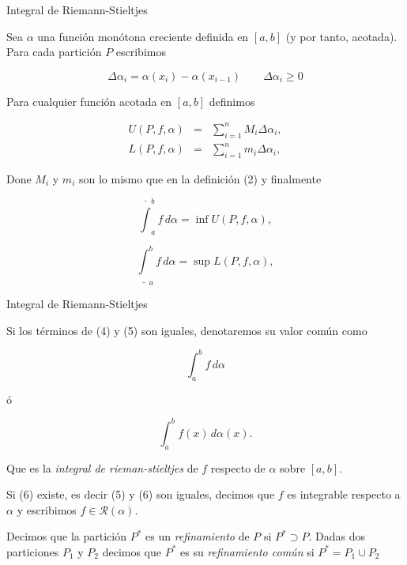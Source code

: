 \documentclass[11pt]{beamer}
\begin{document}
\begin{frame}{Integral de Riemann-Stieltjes}

Sea $\alpha$ una función monótona creciente definida en $[a, b]$ (y por tanto, acotada). Para cada partición $P$ escribimos

\[
	\Delta \alpha_i = \alpha(x_i) - \alpha(x_{i-1}) \qquad \Delta\alpha_i \geq 0
\]

Para cualquier función acotada en $[a, b]$ definimos

\[
	\begin{array}{rcl}
		U(P, f, \alpha) & = & \sum_{i=1}^n M_i \Delta \alpha_i, \\
		L(P, f, \alpha) & = & \sum_{i=1}^n m_i \Delta \alpha_i,
	\end{array}
\]

Done $M_i$ y $m_i$ son lo mismo que en la definición (2) y finalmente 

\begin{equation}
	\overline{\int}_a^b f\,d\alpha = \inf U(P, f, \alpha),
\end{equation}

\begin{equation}
	\underline{\int}_a^b f\,d\alpha = \sup L(P, f, \alpha),
\end{equation}

\end{frame}

\begin{frame}{Integral de Riemann-Stieltjes}

\begin{definition}[4]

Si los términos de (4) y (5) son iguales, denotaremos su valor común como

\begin{equation}
	\int_a^b f\,d\alpha
\end{equation}

ó

\begin{equation}
	\int_a^b f(x)\,d\alpha(x).
\end{equation}

Que es la \textit{integral de rieman-stieltjes} de $f$ respecto de $\alpha$ sobre $[a, b]$.

Si (6) existe, es decir (5) y (6) son iguales, decimos que $f$ es integrable respecto a $\alpha$ y escribimos $f \in \mathcal{R}(\alpha)$.

\end{definition}

\end{frame}

\begin{frame}

\begin{definition}
Decimos que la partición $P^*$ es un \textit{refinamiento} de $P$ si $P^* \supset P$. Dadas dos particiones $P_1$ y $P_2$ decimos que $P^*$ es su \textit{refinamiento común} si $P^* = P_1 \cup P_2$
\end{definition}

\end{frame}
\end{document}
